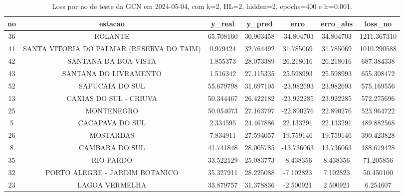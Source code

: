 \begin{table}[h]
\centering
\caption{Loss por no de teste da GCN em 2024-05-04, com k=2, HL=2, hidden=2, epochs=400 e lr=0.001.}
\label{tab:gcn_loss_k2_hl2_h2_e400_d20240504}
\begin{tabular}{ccccccc}
\toprule
no & estacao & y\_real & y\_pred & erro & erro\_abs & loss\_no \\
\midrule
36 & ROLANTE & 65.708160 & 30.903458 & -34.804703 & 34.804703 & 1211.367310 \\
41 & SANTA VITORIA DO PALMAR (RESERVA DO TAIM) & 0.979424 & 32.764492 & 31.785069 & 31.785069 & 1010.290588 \\
42 & SANTANA DA BOA VISTA & 1.855373 & 28.073389 & 26.218016 & 26.218016 & 687.384338 \\
43 & SANTANA DO LIVRAMENTO & 1.516342 & 27.115335 & 25.598993 & 25.598993 & 655.308472 \\
52 & SAPUCAIA DO SUL & 55.679798 & 31.697105 & -23.982693 & 23.982693 & 575.169556 \\
13 & CAXIAS DO SUL - CRIUVA & 50.344467 & 26.422182 & -23.922285 & 23.922285 & 572.275696 \\
25 & MONTENEGRO & 50.054073 & 27.163797 & -22.890276 & 22.890276 & 523.964722 \\
5 & CACAPAVA DO SUL & 2.334595 & 24.467886 & 22.133291 & 22.133291 & 489.882568 \\
26 & MOSTARDAS & 7.834911 & 27.594057 & 19.759146 & 19.759146 & 390.423828 \\
8 & CAMBARA DO SUL & 41.741848 & 28.005785 & -13.736063 & 13.736063 & 188.679428 \\
35 & RIO PARDO & 33.522129 & 25.083773 & -8.438356 & 8.438356 & 71.205856 \\
32 & PORTO ALEGRE - JARDIM BOTANICO & 35.327911 & 28.225088 & -7.102823 & 7.102823 & 50.450100 \\
23 & LAGOA VERMELHA & 33.879757 & 31.378836 & -2.500921 & 2.500921 & 6.254607 \\
\bottomrule
\end{tabular}
\end{table}
